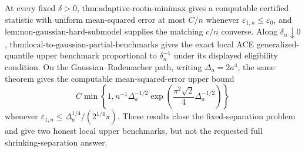 At every fixed \(\delta>0\), \(\text{thm:adaptive-rootn-minimax}\) gives a computable certified statistic with uniform mean-squared error at most \(C/n\) whenever \(\varepsilon_{1,n}\le\varepsilon_0\), and \(\text{lem:non-gaussian-hard-submodel}\) supplies the matching \(c/n\) converse.  Along \(\delta_n\downarrow0\), \(\text{thm:local-to-gaussian-partial-benchmarks}\) gives the exact local ACE generalized-quantile upper benchmark proportional to \(\delta_n^{-1}\) under its displayed eligibility condition.  On the Gaussian--Rademacher path, writing \(\Delta_a=2a^4\), the same theorem gives the computable mean-squared-error upper bound
\[
 C\min\!\left\{1,n^{-1}\Delta_a^{-1/2}
 \exp\!\left(\frac{\pi^2\sqrt2}{4}\Delta_a^{-1/2}\right)\right\}
\]
whenever \(\varepsilon_{1,n}\le\Delta_a^{1/4}/(2^{1/4}\pi)\).  These results close the fixed-separation problem and give two honest local upper benchmarks, but not the requested full shrinking-separation answer.
